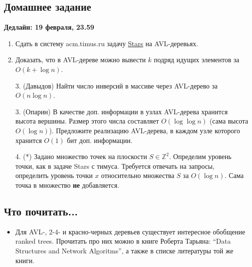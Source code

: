 \subsection{Домашнее задание}
\textbf{Дедлайн: 19 февраля, 23.59}

\begin{enumerate}

  \item Сдать в систему acm.timus.ru задачу
\href{http://acm.timus.ru/problem.aspx?space=1&num=1028}{Stars}
на AVL-деревьях.

  \item Доказать, что в AVL-дереве можно вывести $k$ подряд идущих элементов за
$O(k + \log n)$.

  \item[3.] (Давыдов) Найти число инверсий в массиве через AVL-дерево за $O(n \log n)$.

  \item[3.] (Опарин) В качестве доп. информации в узлах AVL-дерева хранится
высота вершины. Размер этого числа составляет $O(\log \log n)$ (сама высота
$O(\log n)$). Предложите реализацию AVL-дерева, в каждом узле которого
хранится $O(1)$ бит доп. информации.

  \item[4.] (*) Задано множество точек на плоскости $S \in \mathbb{Z}^2$.
Определим уровень точки, как в задаче Stars с тимуса.  Требуется отвечать на
запросы, определить уровень точки $x$ относительно множества $S$ за $O(\log n)$.
Сама точка в множество \textbf{не} добавляется.

\end{enumerate}

\subsection{Что почитать...}

\begin{itemize}
  
  \item Для AVL-, 2-4- и красно-черных деревьев существует интересное обобщение
ranked trees. Прочитать про них можно в книге Роберта Тарьяна: ``Data Structures
and Network Algoritms'', а также в списке литературы той же книги.

\end{itemize}

\clearpage
